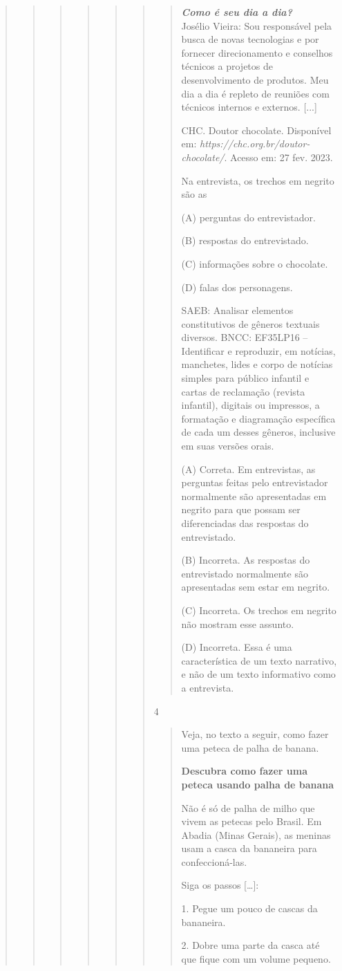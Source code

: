 \begin{boxlist}
{{\begin{quote}
\begin{quote}
\begin{quote}
{\begin{quote}
{\begin{quote}
\begin{quote}
\begin{quote}
\emph{\textbf{Como é seu dia a dia?}}\\
Josélio Vieira: Sou responsável pela busca de novas tecnologias e por fornecer
direcionamento e conselhos técnicos a projetos de desenvolvimento de
produtos. Meu dia a dia é repleto de reuniões com técnicos internos e
externos. {[}...{]}

CHC. Doutor chocolate. Disponível em:
\emph{https://chc.org.br/doutor-chocolate/}. Acesso em: 27 fev. 2023.

Na entrevista, os trechos em negrito são as

(A) perguntas do entrevistador.

(B) respostas do entrevistado.

(C) informações sobre o chocolate.

(D) falas dos personagens.

SAEB: Analisar elementos constitutivos de gêneros textuais diversos.
BNCC: EF35LP16 -- Identificar e reproduzir, em notícias, manchetes, lides e
corpo de notícias simples para público infantil e cartas de reclamação
(revista infantil), digitais ou impressos, a formatação e diagramação
específica de cada um desses gêneros, inclusive em suas versões orais.

(A) Correta. Em entrevistas, as perguntas feitas pelo entrevistador
normalmente são apresentadas em negrito para que possam ser
diferenciadas das respostas do entrevistado.

(B) Incorreta. As respostas do entrevistado normalmente são apresentadas
sem estar em negrito.

(C) Incorreta. Os trechos em negrito não mostram esse assunto.

(D) Incorreta. Essa é uma característica de um texto narrativo, e não de
um texto informativo como a entrevista.
\end{quote}

\num{4}

\begin{quote}
Veja, no texto a seguir, como fazer uma peteca de palha de banana.

\textbf{Descubra como fazer uma peteca usando palha de banana}

Não é só de palha de milho que vivem as petecas pelo Brasil. Em Abadia
(Minas Gerais), as meninas usam a casca da bananeira para
confeccioná-las.

Siga os passos {[}\ldots{}{]}:

1. Pegue um pouco de cascas da bananeira.

2. Dobre uma parte da casca até que fique com um volume pequeno.


\end{quote}
\end{quote}
\end{quote}}
\end{quote}}
\end{quote}
\end{quote}
\end{quote}}}
\end{boxlist}
